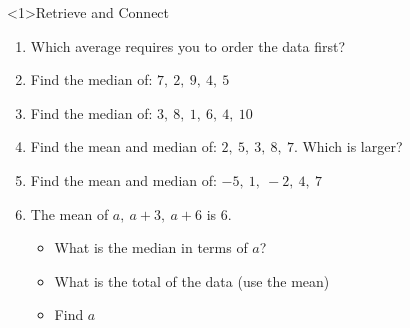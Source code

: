 \documentclass{beamer}
\newcommand{\ashow}[1]{\uncover<2->{\textcolor{red}{\small #1}}}
\newcommand{\ashowq}[1]{\alt<2->{\textcolor{red}{\small #1}}{?}}
\begin{document}
\begin{frame}<1>{Retrieve and Connect}
\vspace{-0.8em}

\footnotesize
\begin{enumerate}\itemsep2pt
  \item Which average requires you to order the data first? \ashow{Median}
  \item Find the median of: $7,\ 2,\ 9,\ 4,\ 5$ \ashow{$=5$}
  \item Find the median of: $3,\ 8,\ 1,\ 6,\ 4,\ 10$ \ashow{$=5$}
  \item Find the mean and median of: $2,\ 5,\ 3,\ 8,\ 7$.  
        Which is larger? \ashow{Mean $=5$, median $=5$ (equal).}
  \item Find the mean and median of: $-5,\ 1,\ -2,\ 4,\ 7$ \ashow{Mean $=1$, median $=1$.}
  \item The mean of $a,\ a+3,\ a+6$ is $6$.
        \begin{itemize}\footnotesize
        \item What is the median in terms of $a$? \ashow{$a+3$}
          \item What is the total of the data (use the mean) \ashow{$18$}
          \item Find $a$ \ashow{$a=3$}
        \end{itemize}
\end{enumerate}

\end{frame}
\end{document}
